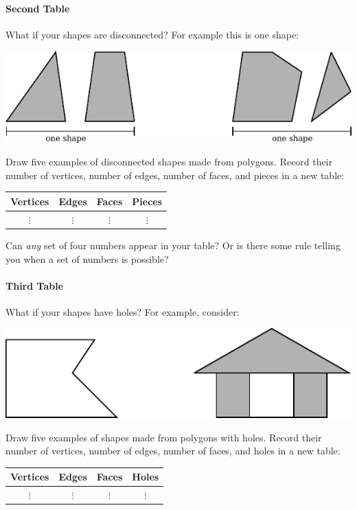 \documentclass{ximera}
\begin{document}
\paragraph{Second Table}

\begin{question}
What if your shapes are disconnected? For example this is one shape:
\begin{image}
\includegraphics{eulerCharPoly2.pdf}
\end{image}
Draw five examples of disconnected shapes made from polygons. Record
their number of vertices, number of edges, number of faces, and pieces in a new
table:
\begin{center}
\begin{tabular}{c|c|c|c}
Vertices & Edges & Faces & Pieces\\
\hline\hline
 $\vdots$  & $\vdots$  & $\vdots$  & $\vdots$  \\ 
\end{tabular}
\end{center}
\end{question}

\begin{question}
Can \textit{any} set of four  numbers appear in your table? Or is
there some rule telling you when a set of numbers is possible? 
\end{question}


\paragraph{Third Table}


\begin{question}
What if your shapes have holes? For example, consider:
\begin{image}
\includegraphics{eulerCharPoly3.pdf}
\end{image}
Draw five examples of shapes made from polygons with holes. Record
their number of vertices, number of edges, number of faces, and holes in a new
table:
\begin{center}
\begin{tabular}{c|c|c|c}
Vertices & Edges & Faces & Holes\\
\hline\hline
 $\vdots$  & $\vdots$  & $\vdots$  & $\vdots$  \\ 
\end{tabular}
\end{center}
\end{question}
\end{document}

